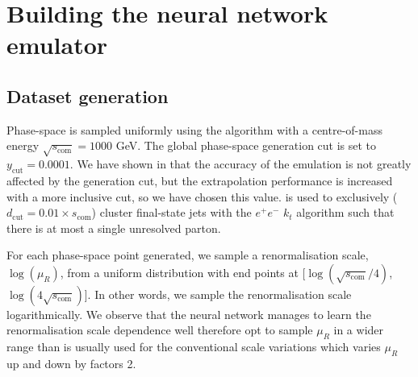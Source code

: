 \documentclass[main.tex]{subfiles}
\begin{document}
\section{Building the neural network emulator}\label{sec:1L_nn}
\subsection*{Dataset generation}
Phase-space is sampled uniformly using the {\RAMBO} algorithm
\cite{Kleiss:1985gy} with a centre-of-mass energy
$\sqrt{s_{\mathrm{com}}} = 1000$ GeV. The global phase-space
generation cut is set to $y_{\mathrm{cut}} = 0.0001$.
We have shown in \cite{Maitre:2021uaa} that the accuracy of the emulation
is not greatly affected by the generation cut, but the extrapolation
performance is increased with a more inclusive cut, so we have chosen this
value. 
{\FastJet} \cite{Cacciari:2011ma,noel_dawe_2021_4446849} is
used to exclusively ($d_{\mathrm{cut}} = 0.01 \times s_{\mathrm{com}}$)
cluster final-state jets with the $e^{+}e^{-}$ $k_{t}$
algorithm such that there is at most a single unresolved parton.

For each phase-space point generated, we sample a
renormalisation scale, $\log(\mu_{R})$, from a uniform distribution
with end points at [$\log(\sqrt{s_{\text{com}}}/4)$, $\log(4\sqrt{s_{\text{com}}})$].
In other words, we sample the renormalisation scale logarithmically.
We observe that the neural network manages to learn the
renormalisation scale dependence well therefore opt to
sample $\mu_{R}$ in a wider range than is usually used
for the conventional scale variations which varies $\mu_{R}$
up and down by factors 2.
\end{document}
